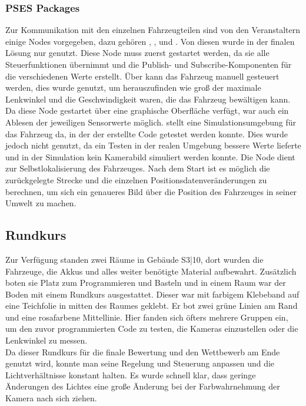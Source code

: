 \subsubsection{PSES Packages}
\label{sec:psespackages}
Zur Kommunikation mit den einzelnen Fahrzeugteilen sind von den Veranstaltern einige Nodes vorgegeben, dazu gehören , ,  und . Von diesen wurde in der finalen Lösung nur  genutzt. Diese Node muss zuerst gestartet werden, da sie alle Steuerfunktionen übernimmt und die Publish- und Subscribe-Komponenten für die verschiedenen Werte erstellt. 
Über  kann das Fahrzeug manuell gesteuert werden, dies wurde genutzt, um herauszufinden wie groß der maximale Lenkwinkel und die Geschwindigkeit waren, die das Fahrzeug bewältigen kann. Da diese Node gestartet über eine graphische Oberfläche verfügt, war auch ein Ablesen der jeweiligen Sensorwerte möglich.  stellt eine Simulationsumgebung für das Fahrzeug da, in der der erstellte Code getestet werden konnte. Dies wurde jedoch nicht genutzt, da ein Testen in der realen Umgebung bessere Werte lieferte und in der Simulation kein Kamerabild simuliert werden konnte. 
Die Node  dient zur Selbstlokalisierung des Fahrzeuges. Nach dem Start ist es möglich die zurückgelegte Strecke und die einzelnen Positionsdatenveränderungen zu berechnen, um sich ein genaueres Bild über die Position des Fahrzeuges in seiner Umwelt zu machen.

\subsection{Rundkurs}
\label{sec:rundkurs}
Zur Verfügung standen zwei Räume in Gebäude S3|10, dort wurden die Fahrzeuge, die Akkus und alles weiter benötigte Material aufbewahrt. Zusätzlich boten sie Platz zum Programmieren und Basteln und in einem Raum war der Boden mit einem Rundkurs ausgestattet. Dieser war mit farbigem Klebeband auf eine Teichfolie in mitten des Raumes geklebt. Er bot zwei grüne Linien am Rand und eine rosafarbene Mittellinie. Hier fanden sich öfters mehrere Gruppen ein, um den zuvor programmierten Code zu testen, die Kameras einzustellen oder die Lenkwinkel zu messen. \\
Da dieser Rundkurs für die finale Bewertung und den Wettbewerb am Ende genutzt wird, konnte man seine Regelung und Steuerung anpassen und die Lichtverhältnisse konstant halten. Es wurde schnell klar, dass geringe Änderungen des Lichtes eine große Änderung bei der Farbwahrnehmung der Kamera nach sich ziehen. 

